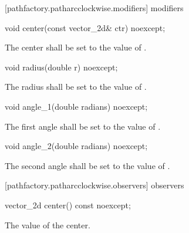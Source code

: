  [pathfactory.patharcclockwise.modifiers]{ modifiers}

\begin{itemdecl}
    void center(const vector_2d& ctr) noexcept;
\end{itemdecl}
\begin{itemdescr}
	\pnum
	\effects
	The center shall be set to the value of .
\end{itemdescr}

\begin{itemdecl}
    void radius(double r) noexcept;
\end{itemdecl}
\begin{itemdescr}
	\pnum
	\effects
	The radius shall be set to the value of .
\end{itemdescr}

\begin{itemdecl}
    void angle_1(double radians) noexcept;
\end{itemdecl}
\begin{itemdescr}
	\pnum
	\effects
	The first angle shall be set to the value of .
\end{itemdescr}

\begin{itemdecl}
    void angle_2(double radians) noexcept;
\end{itemdecl}
\begin{itemdescr}
	\pnum
	\effects
	The second angle shall be set to the value of .
\end{itemdescr}

 [pathfactory.patharcclockwise.observers]{ observers}

\begin{itemdecl}
    vector_2d center() const noexcept;
\end{itemdecl}
\begin{itemdescr}
	\pnum
	\returns
	The value of the center.
\end{itemdescr}

